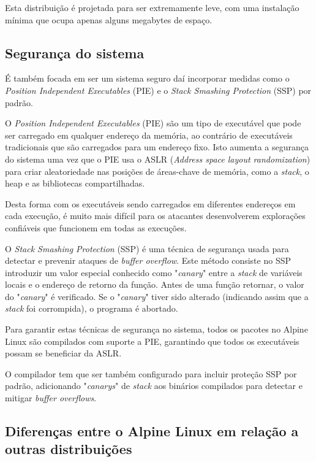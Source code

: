 Esta distribuição é projetada para ser extremamente leve, com uma instalação 
mínima que ocupa apenas alguns megabytes de espaço. \\

\subsection{Segurança do sistema}

É também focada em ser um sistema 
seguro daí incorporar  medidas como o \textit{Position Independent Executables} (PIE) e 
o \textit{Stack Smashing Protection} (SSP) por padrão.

O \textit{Position Independent Executables} (PIE) são um tipo de executável que pode ser 
carregado em qualquer endereço da memória, ao contrário de executáveis tradicionais 
que são carregados para um endereço fixo. Isto aumenta a segurança do sistema uma vez que
o PIE usa o ASLR (\textit{Address space layout randomization}) para criar aleatoriedade
nas posições de áreas-chave de memória, como a \textit{stack}, o heap e as bibliotecas compartilhadas.

Desta forma com os executáveis sendo carregados em diferentes endereços em cada execução, 
é muito mais difícil para os atacantes desenvolverem explorações confiáveis que funcionem 
em todas as execuções.


O \textit{Stack Smashing Protection} (SSP) é uma técnica de segurança usada para detectar e
prevenir ataques de \textit{buffer overflow}. Este método consiste no SSP introduzir um valor 
especial conhecido como "\textit{canary}" entre a \textit{stack} de variáveis locais e o endereço de 
retorno da função. Antes de uma função retornar, o valor do "\textit{canary}" é verificado.
Se o "\textit{canary}" tiver sido alterado (indicando assim que a \textit{stack} foi corrompida), 
o programa é abortado. 

Para garantir estas técnicas de segurança no sistema, todos os pacotes no Alpine Linux
são compilados com suporte a PIE, garantindo que todos os executáveis possam se 
beneficiar da ASLR.

O compilador tem que ser também configurado para incluir proteção SSP por padrão,
adicionando "\textit{canarys}" de \textit{stack} aos binários compilados para detectar 
e mitigar \textit{buffer overflows}.



\subsection{Diferenças entre o Alpine Linux em relação a outras distribuições}

